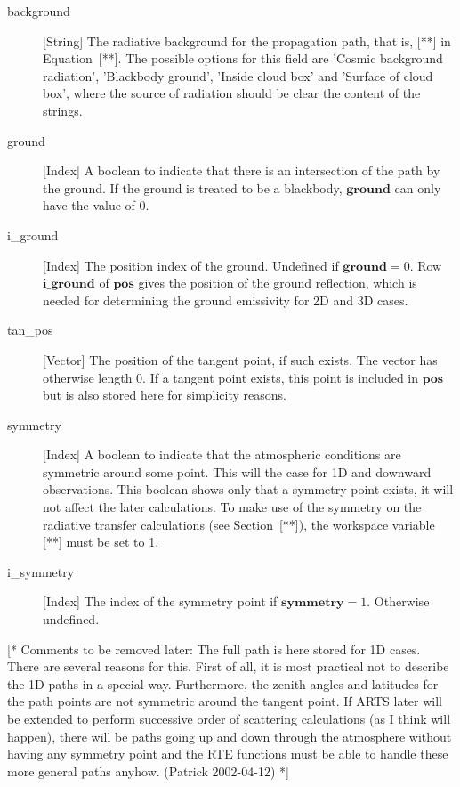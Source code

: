 \begin{description}
   \item[background] [String] The radiative background for the
     propagation path, that is, [**] in Equation~[**]. The possible
     options for this field are 'Cosmic background radiation',
     'Blackbody ground', 'Inside cloud box' and 'Surface of cloud
     box', where the source of radiation should be clear the content
     of the strings.

  \item[ground] [Index] A boolean to indicate that there is an intersection
     of the path by the ground. If the ground is treated to be a blackbody,
     $\mathbf{ground}$ can only have the value of 0.
     
   \item[i\_ground] [Index] The position index of the ground.
     Undefined if $\mathbf{ground}=0$. Row $\mathbf{i\_ground}$ of
     $\mathbf{pos}$ gives the position of the ground reflection, which
     is needed for determining the ground emissivity for 2D and 3D cases.

  \item[tan\_pos] [Vector] The position of the tangent point, if such exists.
     The vector has otherwise length 0. If a tangent point exists, this point
     is included in $\mathbf{pos}$ but is also stored here for simplicity
     reasons.
     
   \item[symmetry] [Index] A boolean to indicate that the atmospheric
     conditions are symmetric around some point. This will the case
     for 1D and downward observations. This boolean shows only that a
     symmetry point exists, it will not affect the later calculations.
     To make use of the symmetry on the radiative transfer
     calculations (see Section~[**]), the workspace variable [**] must
     be set to 1.

   \item[i\_symmetry] [Index] The index of the symmetry point if 
     $\mathbf{symmetry}=1$. Otherwise undefined.

\end{description}

[* Comments to be removed later: The full path is here stored for 1D
cases.  There are several reasons for this. First of all, it is most
practical not to describe the 1D paths in a special way. Furthermore,
the zenith angles and latitudes for the path points are not symmetric
around the tangent point. If ARTS later will be extended to perform
successive order of scattering calculations (as I think will happen),
there will be paths going up and down through the atmosphere without
having any symmetry point and the RTE functions must be able to handle
these more general paths anyhow. (Patrick 2002-04-12) *]



